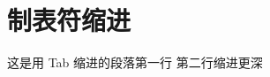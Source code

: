\documentclass{article}
\begin{document}
\section{制表符缩进}
	这是用 Tab 缩进的段落第一行
		第二行缩进更深
\end{document}
